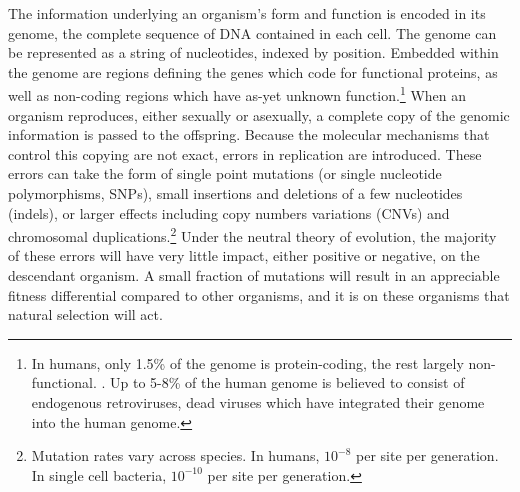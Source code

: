 The information underlying an organism's form and function is encoded in its genome, the complete sequence of DNA contained in each cell.
The genome can be represented as a string of nucleotides, indexed by position.
Embedded within the genome are regions defining the genes which code for functional proteins, as well as non-coding regions which have as-yet unknown function.\footnote{In humans, only 1.5\% of the genome is protein-coding, the rest largely non-functional. \cite{Lander:2001hk}. Up to 5-8\% of the human genome is believed to consist of endogenous retroviruses, dead viruses which have integrated their genome into the human genome.}
When an organism reproduces, either sexually or asexually, a complete copy of the genomic information is passed to the offspring.
Because the molecular mechanisms that control this copying are not exact, errors in replication are introduced.
These errors can take the form of single point mutations (or single nucleotide polymorphisms, SNPs), small insertions and deletions of a few nucleotides (indels), or larger effects including copy numbers variations (CNVs) and chromosomal duplications.\footnote{Mutation rates vary across species. In humans, $10^{-8}$ per site per generation. In single cell bacteria, $10^{-10}$ per site per generation.}
Under the neutral theory of evolution, the majority of these errors will have very little impact, either positive or negative, on the descendant organism.
A small fraction of mutations will result in an appreciable fitness differential compared to other organisms, and it is on these organisms that natural selection will act.

